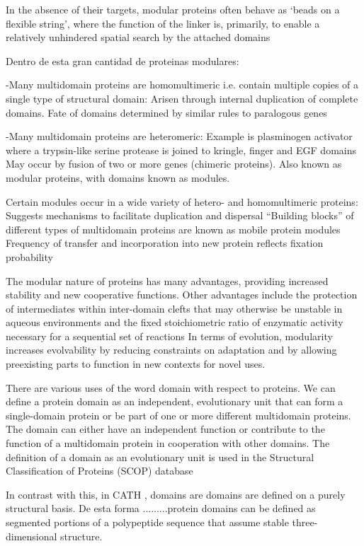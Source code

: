 In the absence of their targets, modular proteins
often behave as ‘beads on a flexible string’, where the
function of the linker is, primarily, to enable a relatively
unhindered spatial search by the attached domains


Dentro de esta gran cantidad de proteinas modulares:

-Many multidomain proteins are homomultimeric i.e. contain multiple copies of a single type of structural domain: Arisen through internal duplication of complete domains. Fate of domains determined by similar rules to paralogous genes

-Many multidomain proteins are heteromeric: Example is plasminogen activator where a trypsin-like serine protease is joined to kringle, finger and EGF domains
May occur by fusion of two or more genes (chimeric proteins). Also known as modular proteins, with domains known as modules. 

Certain modules occur in a wide variety of hetero- and homomultimeric proteins:
Suggests mechanisms to facilitate duplication and dispersal
“Building blocks” of different types of multidomain proteins are known as mobile protein modules
Frequency of transfer and incorporation into new protein reflects fixation probability


The modular nature of proteins has many advantages, providing increased stability and new cooperative functions.
Other advantages include the protection of intermediates within inter-domain clefts that may otherwise be unstable in aqueous environments and the fixed stoichiometric ratio of enzymatic activity necessary for a sequential set of reactions
In terms of evolution, modularity increases evolvability by reducing constraints on adaptation and by allowing preexisting parts to function in new contexts for novel uses.

There are various uses of the word domain with respect to proteins. 
We can define a protein domain as an independent, evolutionary unit that can form a single-domain protein or be part of one or more different multidomain proteins. The domain can either have an independent
function or contribute to the function of a multidomain protein in cooperation with other domains. 
The definition of a domain as an evolutionary unit is used in the Structural Classification of Proteins (SCOP) database \cite{murzin1995scop}

In contrast with this, in CATH \cite{orengo1997cath}, domains are domains are defined on a purely structural basis.
De esta forma .........protein domains can be defined as segmented portions of a polypeptide sequence that assume stable three-dimensional structure.

